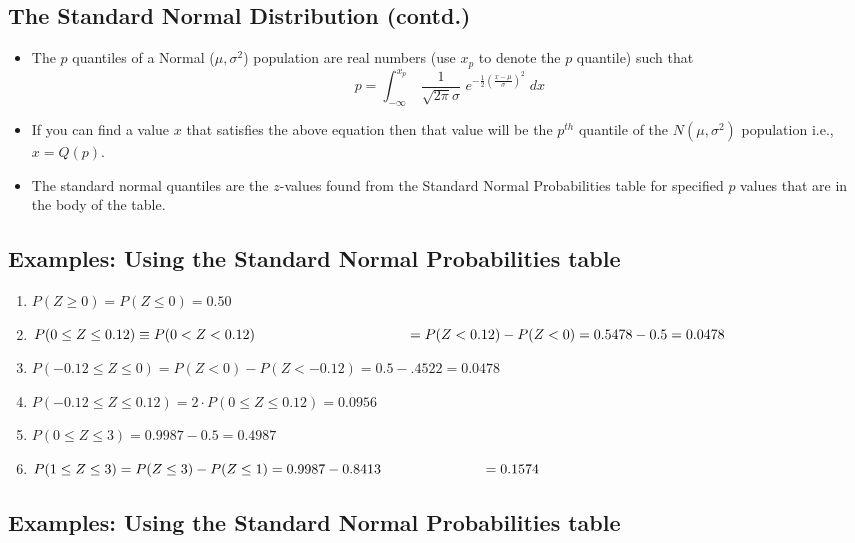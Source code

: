 \documentclass[
  letterpaper,
  DIV=11,
  numbers=noendperiod]{scrartcl}
\begin{document}
\subsection{The Standard Normal Distribution
(contd.)}\label{the-standard-normal-distribution-contd.-1}

\begin{itemize}
\item
  The \(p\) quantiles of a Normal (\(\mu,\sigma^2\)) population are real
  numbers (use \(x_p\) to denote the \(p\) quantile) such that
  \[p = \int_{-\infty}^{x_p} \;
  \frac{1}{\sqrt{2\pi}\sigma} \, \,e^{-\frac12(\frac{x-\mu}{\sigma})^2} \; dx\]
\item
  If you can find a value \(x\) that satisfies the above equation then
  that value will be the \(p^{th}\) quantile of the \(N(\mu,\sigma^2)\)
  population i.e., \(x = Q(p)\).
\item
  The {standard normal quantiles} are the \(z\)-values found from the
  Standard Normal Probabilities table for specified \(p\) values that
  are in the body of the table.
\end{itemize}

\subsection{Examples: Using the Standard Normal Probabilities
table}\label{examples-using-the-standard-normal-probabilities-table}

\begin{enumerate}
\def\labelenumi{\arabic{enumi}.}
\item
  \(P(Z \geq 0) = P(Z \leq 0) = 0.50\)
\item
  \(P(0 \leq Z \leq 0.12) \equiv P(0 < Z < 0.12) \hspace*{1.5in}=P(Z<0.12)-P(Z<0)=0.5478-0.5 = 0.0478\)
\item
  \(P(-0.12 \leq Z \leq 0) =P(Z<0)-P(Z<-0.12)
   = 0.5-.4522=0.0478\)
\item
  \(P(-0.12 \leq Z \leq 0.12) = 2 \cdot P(0 \leq Z \leq 0.12) = 0.0956\)
\item
  \(P(0 \leq Z \leq 3) = 0.9987-0.5=0.4987\)
\item
  \(P(1 \leq Z \leq 3 ) = P(Z \leq 3)- P(Z \leq 1) = 0.9987 - 0.8413 \hspace*{1in}=0.1574\)
\end{enumerate}

\subsection{Examples: Using the Standard Normal Probabilities
table}\label{examples-using-the-standard-normal-probabilities-table-1}
\end{document}
